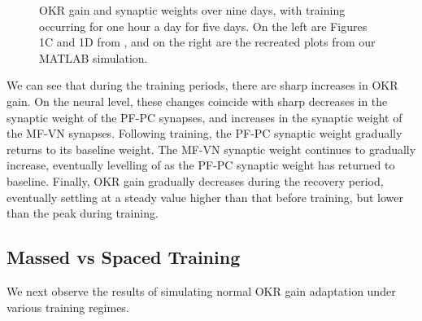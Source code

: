 \documentclass[10pt]{article}
\begin{document}
\begin{figure}[h]
    \caption{OKR gain and synaptic weights over nine days, with training occurring for one hour a day for five days. On the left are Figures 1C and 1D from \cite{yamazaki2015modeling}, and on the right are the recreated plots from our MATLAB simulation.}
    \label{fig:normal_okr_adaptation}
\end{figure}

We can see that during the training periods, there are sharp increases in OKR gain. On the neural level, these changes coincide with sharp decreases in the synaptic weight of the PF-PC synapses, and increases in the synaptic weight of the MF-VN synapses. Following training, the PF-PC synaptic weight gradually returns to its baseline weight. The MF-VN synaptic weight continues to gradually increase, eventually levelling of as the PF-PC synaptic weight has returned to baseline. Finally, OKR gain gradually decreases during the recovery period, eventually settling at a steady value higher than that before training, but lower than the peak during training.

\subsection{Massed vs Spaced Training}

We next observe the results of simulating normal OKR gain adaptation under various training regimes.
\end{document}
